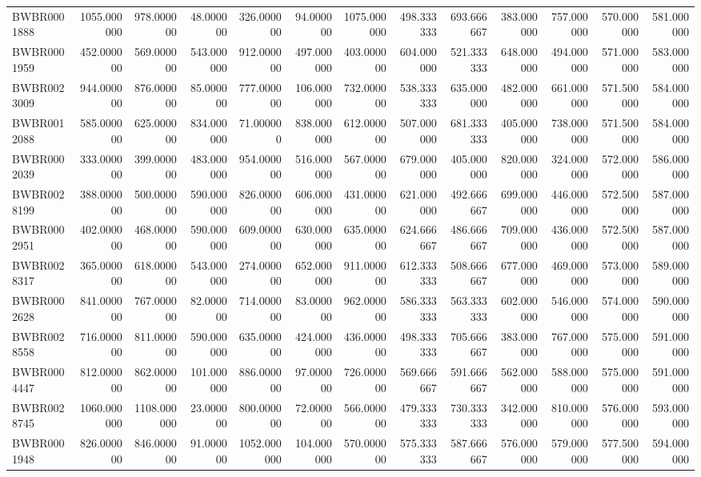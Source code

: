 \begin{longtable}{lrrrrrrrrrrrr}
BWBR0001888 & 1055.000000 & 978.000000 & 48.000000 & 326.000000 & 94.000000 & 1075.000000 & 498.333333 & 693.666667 & 383.000000 & 757.000000 & 570.000000 & 581.000000 \\
BWBR0001959 & 452.000000 & 569.000000 & 543.000000 & 912.000000 & 497.000000 & 403.000000 & 604.000000 & 521.333333 & 648.000000 & 494.000000 & 571.000000 & 583.000000 \\
BWBR0023009 & 944.000000 & 876.000000 & 85.000000 & 777.000000 & 106.000000 & 732.000000 & 538.333333 & 635.000000 & 482.000000 & 661.000000 & 571.500000 & 584.000000 \\
BWBR0012088 & 585.000000 & 625.000000 & 834.000000 & 71.000000 & 838.000000 & 612.000000 & 507.000000 & 681.333333 & 405.000000 & 738.000000 & 571.500000 & 584.000000 \\
BWBR0002039 & 333.000000 & 399.000000 & 483.000000 & 954.000000 & 516.000000 & 567.000000 & 679.000000 & 405.000000 & 820.000000 & 324.000000 & 572.000000 & 586.000000 \\
BWBR0028199 & 388.000000 & 500.000000 & 590.000000 & 826.000000 & 606.000000 & 431.000000 & 621.000000 & 492.666667 & 699.000000 & 446.000000 & 572.500000 & 587.000000 \\
BWBR0002951 & 402.000000 & 468.000000 & 590.000000 & 609.000000 & 630.000000 & 635.000000 & 624.666667 & 486.666667 & 709.000000 & 436.000000 & 572.500000 & 587.000000 \\
BWBR0028317 & 365.000000 & 618.000000 & 543.000000 & 274.000000 & 652.000000 & 911.000000 & 612.333333 & 508.666667 & 677.000000 & 469.000000 & 573.000000 & 589.000000 \\
BWBR0002628 & 841.000000 & 767.000000 & 82.000000 & 714.000000 & 83.000000 & 962.000000 & 586.333333 & 563.333333 & 602.000000 & 546.000000 & 574.000000 & 590.000000 \\
BWBR0028558 & 716.000000 & 811.000000 & 590.000000 & 635.000000 & 424.000000 & 436.000000 & 498.333333 & 705.666667 & 383.000000 & 767.000000 & 575.000000 & 591.000000 \\
BWBR0004447 & 812.000000 & 862.000000 & 101.000000 & 886.000000 & 97.000000 & 726.000000 & 569.666667 & 591.666667 & 562.000000 & 588.000000 & 575.000000 & 591.000000 \\
BWBR0028745 & 1060.000000 & 1108.000000 & 23.000000 & 800.000000 & 72.000000 & 566.000000 & 479.333333 & 730.333333 & 342.000000 & 810.000000 & 576.000000 & 593.000000 \\
BWBR0001948 & 826.000000 & 846.000000 & 91.000000 & 1052.000000 & 104.000000 & 570.000000 & 575.333333 & 587.666667 & 576.000000 & 579.000000 & 577.500000 & 594.000000 \\

\end{longtable}
